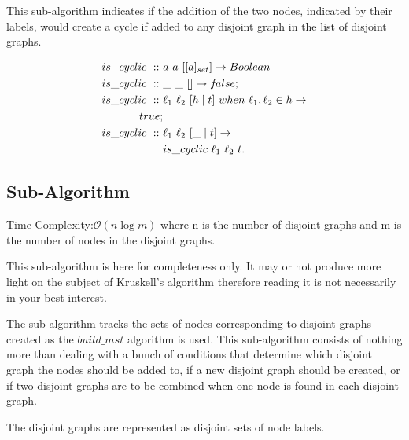 \documentclass[a4paper,10pt]{book}
\newcommand\when{\  when\ }
\newcommand{\false}{f\kern-0.25ex{alse}}
\begin{document}
This sub-algorithm indicates if the addition of the two nodes, indicated by their labels, would create a cycle if added to any disjoint graph in the list of disjoint graphs.

\begin{align*}
is\_cyclic\ ::\ &a\ a\ [[a]_{set}]\rightarrow Boolean\\
is\_cyclic\ ::\ &\_\ \_\ []\rightarrow \false;\\
is\_cyclic\ ::\ &\ell_1\ \ell_2\ [h\mid t]\when \ell_1,\ell_2\in h\rightarrow\\ true;\\
is\_cyclic\ ::\ &\ell_1\ \ell_2\ [\_\mid t]\rightarrow \\
	&is\_cyclic\ \ell_1\ \ell_2\ t. 
\end{align*}

\subsection{Sub-Algorithm}
Time Complexity:$\mathcal{O}(n\log m)$ where n is the number of disjoint graphs and m is the number of nodes in the disjoint graphs.

This sub-algorithm is here for completeness only. It may or not produce more light on the subject of Kruskell's algorithm therefore reading it is not necessarily in your best interest. 

The sub-algorithm tracks the sets of nodes corresponding to disjoint graphs created as the $build\_mst$ algorithm is used. This sub-algorithm consists of nothing more than dealing with a bunch of conditions that determine which disjoint graph the nodes should be added to, if a new disjoint graph should be created, or if two disjoint graphs are to be combined when one node is found in each disjoint graph.

The disjoint graphs are represented as disjoint sets of node labels.
\end{document}
